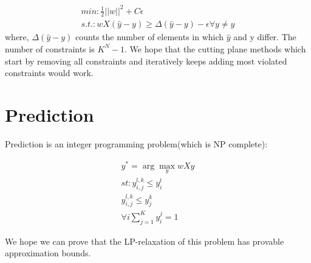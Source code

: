 \documentclass[11pt,a4paper,oneside]{report}
\begin{document}
\begin{eqnarray*}
min: \frac{1}{2} ||w||^2 + C\epsilon\\
s.t.: wX(\hat{y}-y)\ge \Delta(\hat{y}-y) -\epsilon \forall y\neq \hat{y}
\end{eqnarray*}
where, $\Delta(\hat{y}-y)$ counts the number of elements in which $\hat{y}$ and y differ.
The number of constraints is $K^N-1$. We hope that the cutting plane methods\cite{joachims2009cutting} 
which start by removing all constraints and  iteratively keeps adding most violated constraints would work.
\section{Prediction}

Prediction is an integer programming problem(which is NP complete):


\begin{eqnarray*}
y^*=\arg \max _y wXy\\
st: y_{i,j}^{l,k}\le y_i^l\\
y_{i,j}^{l,k}\le y_j^k\\
\forall i \sum_{j=1}^{K} y_i^j = 1
\end{eqnarray*}
 


We hope we can prove that the LP-relaxation of this problem has provable approximation bounds.


\end{document}
